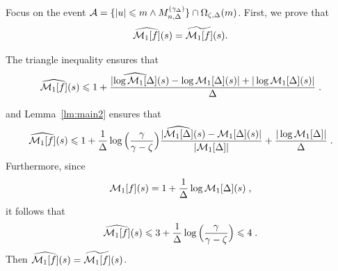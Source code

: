 Focus on the event $\mathcal{A} = \{ |u| \leqslant m \wedge M_{n, \Delta}^{(\gamma_\Delta)} \}  \cap \Omega_{\zeta, \Delta}(m)$. First, we prove that $$\widehat{\mathcal{M}_1[f]}(s) = \widetilde{\mathcal{M}_1[f]}(s).$$

The triangle inequality ensures that
\begin{equation*}
    \widehat{\mathcal{M}_1[f]}(s) \leqslant 1 + \frac{|\widehat{\log \mathcal{M}_1[\Delta]}(s) - \log \mathcal{M}_1[\Delta](s)| + |\log \mathcal{M}_1[\Delta](s)|}{\Delta}
    \; .
\end{equation*}

and Lemma~\ref{lm:main2} ensures that 
\begin{equation*}
    \widehat{\mathcal{M}_1[f]}(s) \leqslant 1 + \frac{1}{\Delta} \log \Big( \frac{\gamma}{\gamma - \zeta}\Big)
    \frac{|\widehat{\mathcal{M}_1[\Delta]}(s) - \mathcal{M}_1[\Delta](s)|}{|\mathcal{M}_1[\Delta]|}
        + \frac{|\log \mathcal{M}_1[\Delta]|}{\Delta}
    \; .
\end{equation*}
Furthermore, since 
\begin{equation*}
    \mathcal{M}_1[f](s) = 1 + \frac{1}{\Delta} \log \mathcal{M}_1[\Delta](s)
    \; ,
\end{equation*}
it follows that
\begin{equation*}
    \widehat{\mathcal{M}_1[f]}(s) \leqslant 3 + \frac{1}{\Delta} \log \Big( \frac{\gamma}{\gamma - \zeta}\Big) \leqslant 4
    \; .
\end{equation*}
Then $\widehat{\mathcal{M}_1[f]}(s) = \widetilde{\mathcal{M}_1[f]}(s)$. \\

